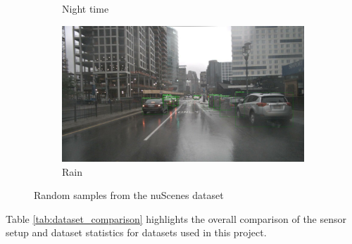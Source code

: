 \documentclass[report.tex]{subfiles}
\begin{document}
\begin{figure}[ht]
\begin{subfigure}{0.3\textwidth}
                \caption{Night time}
                \label{fig:night_cam}
            \end{subfigure}
            \hfill
            \begin{subfigure}{0.3\textwidth}
                \centering
                \includegraphics[width=\linewidth]{images/datasets/nuscenes/samples/rain_cam.png}
                \caption{Rain}
                \label{fig:rain_cam}
            \end{subfigure}
        
            \caption{Random samples from the nuScenes dataset}
            \label{fig:nuscenes_samples}
        \end{figure}
        

        Table \ref{tab:dataset_comparison} highlights the overall comparison of the sensor setup and dataset statistics for datasets used in this project.
\end{document}
